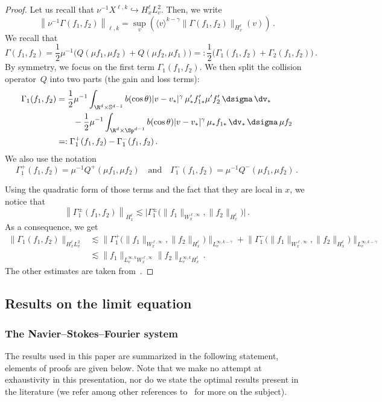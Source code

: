 \begin{proof}
Let us recall that $ \nu^{-1} X^{\ell,k} \hookrightarrow H^\ell_xL^2_v$. Then, we write
\[
\left\| \nu^{-1} \Gamma(f_1,f_2)\right\|_{\ell,k} = \sup_v \left(\langle v \rangle^{k-\gamma} \|\Gamma(f_1,f_2)\|_{H^\ell_x} (v)\right) \,.
\]
We recall that
\[
\Gamma(f_1,f_2)= \frac12\mu^{-1}
\big(Q(\mu f_1,\mu f_2) + Q(\mu f_2,\mu f_1)\big)=: \frac12\Big(\Gamma_1(f_1,f_2) + \Gamma_2(f_1,f_2)\Big) \,.
\]
By symmetry, we focus on the first term $\Gamma_1(f_1,f_2)$. We then split the collision operator~$Q$ into two parts (the gain and loss terms):
\begin{align*}
\Gamma_1(f_1,f_2) &=\frac12 \mu^{-1}\int_{\R^d \times {\mathbb S}^{d-1}} b(\cos \theta) |v-v_*|^\gamma \, \mu'_*f_{1*}' \mu'f_2' \, \dsigma \, \dv_* \\
&\qquad- \frac12\mu^{-1} \int_{\R^d\times \Sp^{d-1}} b(\cos \theta) |v-v_*|^\gamma \, \mu_* f_{1*} \, \dv_* \, \dsigma\, \mu f_2 \\
&=: \Gamma_1^+(f_1,f_2) - \Gamma_1^-(f_1,f_2) \,.
\end{align*}
We also use the notation
\[
\Gamma_1^+ (f_1,f_2)= \mu^{-1} Q^+(\mu f_1,\mu f_2) \quad \text{and}\quad \Gamma_1^-(f_1,f_2) = \mu^{-1} Q^-(\mu f_1,\mu f_2)\,.
\]

Using the quadratic form of those terms and the fact that they are local in $x$, we notice that
\[
\left\|\Gamma_1^{\pm}(f_1,f_2)\right\|_{H^\ell_x} \lesssim \Big|\Gamma_1^{\pm}\big(\|f_1\|_{W^{\ell,\infty}_x}, \|f_2\|_{H^{\ell}_x}\big)\Big| \,.
\]
As a consequence, we get
\begin{align*}
\|\Gamma_1(f_1,f_2)\|_{H^\ell_xL^2_v} &\lesssim \big\|\Gamma_1^{+}\big(\|f_1\|_{W^{\ell,\infty}_x}, \|f_2\|_{H^{\ell}_x}\big)\big\|_{L^{\infty,k-\gamma}_v} + \big\|\Gamma_1^{-}\big(\|f_1\|_{W^{\ell,\infty}_x}, \|f_2\|_{H^{\ell}_x}\big)\big\|_{L^{\infty,k-\gamma}_v} \\
&\lesssim \|f_1\|_{L^{\infty,k}_v W^{\ell,\infty}_x} \|f_2\|_{L^{\infty,k}_v H^\ell_x} \,.
\end{align*}
The other estimates are taken from~\cite[Lemma~4.5.1]{Ukai}.
\end{proof}



\subsection{Results on the limit equation}\label{appendixNS}
\subsubsection{The Navier--Stokes--Fourier system}
The results used in this paper are summarized in the following statement, elements of proofs are given below. Note that we make no attempt at exhaustivity in this presentation, nor do we state the optimal results present in the literature (we refer among other references to~\cite{BCD,cheminSIAM,lemarie1,lemarie2} for more on the subject).

